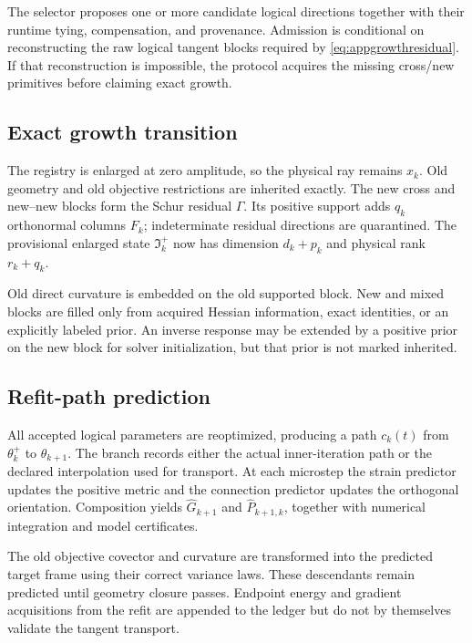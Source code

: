 \documentclass[10pt,twocolumn]{article}
\theoremstyle{definition}
\theoremstyle{remark}
\begin{document}
The selector proposes one or more candidate logical directions together with
their runtime tying, compensation, and provenance.  Admission is conditional
on reconstructing the raw logical tangent blocks required by
\eqref{eq:appgrowthresidual}.  If that reconstruction is impossible, the
protocol acquires the missing cross/new primitives before claiming exact
growth.

\subsection{Exact growth transition}

The registry is enlarged at zero amplitude, so the physical ray remains
$x_k$.  Old geometry and old objective restrictions are inherited exactly.
The new cross and new--new blocks form the Schur residual $\Gamma$.  Its
positive support adds $q_k$ orthonormal columns $F_k$; indeterminate residual
directions are quarantined.  The provisional enlarged state
$\mathfrak I_k^+$ now has dimension $d_k+p_k$ and physical rank $r_k+q_k$.

Old direct curvature is embedded on the old supported block.  New and mixed
blocks are filled only from acquired Hessian information, exact identities,
or an explicitly labeled prior.  An inverse response may be extended by a
positive prior on the new block for solver initialization, but that prior is
not marked inherited.

\subsection{Refit-path prediction}

All accepted logical parameters are reoptimized, producing a path
$c_k(t)$ from $\theta_k^+$ to $\theta_{k+1}$.  The branch records either the
actual inner-iteration path or the declared interpolation used for transport.
At each microstep the strain predictor updates the positive metric and the
connection predictor updates the orthogonal orientation.  Composition yields
$\widehat G_{k+1}$ and $\widehat P_{k+1,k}$, together with numerical
integration and model certificates.

The old objective covector and curvature are transformed into the predicted
target frame using their correct variance laws.  These descendants remain
predicted until geometry closure passes.  Endpoint energy and gradient
acquisitions from the refit are appended to the ledger but do not by
themselves validate the tangent transport.
\end{document}
